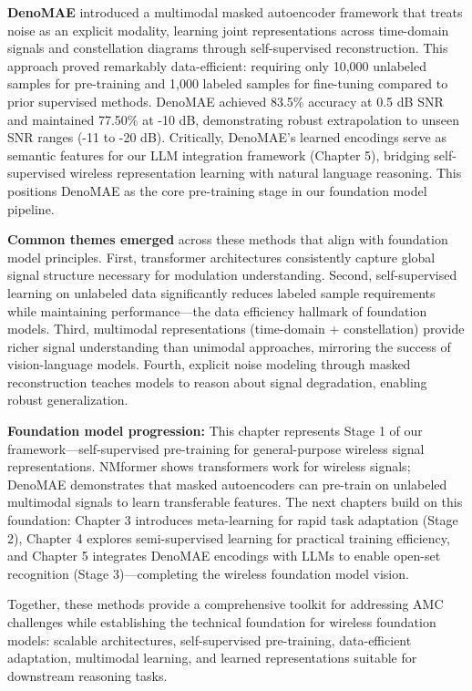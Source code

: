 \textbf{DenoMAE} introduced a multimodal masked autoencoder framework that treats noise as an explicit modality, learning joint representations across time-domain signals and constellation diagrams through self-supervised reconstruction. This approach proved remarkably data-efficient: requiring only 10,000 unlabeled samples for pre-training and 1,000 labeled samples for fine-tuning compared to prior supervised methods. DenoMAE achieved 83.5\% accuracy at 0.5 dB SNR and maintained 77.50\% at -10 dB, demonstrating robust extrapolation to unseen SNR ranges (-11 to -20 dB). Critically, DenoMAE's learned encodings serve as semantic features for our LLM integration framework (Chapter 5), bridging self-supervised wireless representation learning with natural language reasoning. This positions DenoMAE as the core pre-training stage in our foundation model pipeline.

\textbf{Common themes emerged} across these methods that align with foundation model principles. First, transformer architectures consistently capture global signal structure necessary for modulation understanding. Second, self-supervised learning on unlabeled data significantly reduces labeled sample requirements while maintaining performance—the data efficiency hallmark of foundation models. Third, multimodal representations (time-domain + constellation) provide richer signal understanding than unimodal approaches, mirroring the success of vision-language models. Fourth, explicit noise modeling through masked reconstruction teaches models to reason about signal degradation, enabling robust generalization.

\textbf{Foundation model progression:} This chapter represents Stage 1 of our framework—self-supervised pre-training for general-purpose wireless signal representations. NMformer shows transformers work for wireless signals; DenoMAE demonstrates that masked autoencoders can pre-train on unlabeled multimodal signals to learn transferable features. The next chapters build on this foundation: Chapter 3 introduces meta-learning for rapid task adaptation (Stage 2), Chapter 4 explores semi-supervised learning for practical training efficiency, and Chapter 5 integrates DenoMAE encodings with LLMs to enable open-set recognition (Stage 3)—completing the wireless foundation model vision.

Together, these methods provide a comprehensive toolkit for addressing AMC challenges while establishing the technical foundation for wireless foundation models: scalable architectures, self-supervised pre-training, data-efficient adaptation, multimodal learning, and learned representations suitable for downstream reasoning tasks.